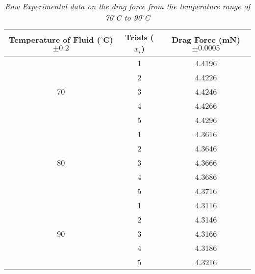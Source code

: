 \begin{table}[H]
  \centering
  \caption{\textit{Raw Experimental data on the drag force from the temperature range of 70$^\circ$C to 90$^\circ$C}}
    \begin{tabular}{ccc}
    \toprule
    Temperature of Fluid ($^\circ$C) $\pm 0.2$ & Trials ($x_i$) & Drag Force (mN) $\pm 0.0005$ \\
    \midrule
    \multirow{5}[10]{*}{70} & 1     & 4.4196 \\
\cmidrule{2-3}          & 2     & 4.4226 \\
\cmidrule{2-3}          & 3     & 4.4246 \\
\cmidrule{2-3}          & 4     & 4.4266 \\
\cmidrule{2-3}          & 5     & 4.4296 \\
    \midrule
    \multirow{5}[10]{*}{80} & 1     & 4.3616 \\
\cmidrule{2-3}          & 2     & 4.3646 \\
\cmidrule{2-3}          & 3     & 4.3666 \\
\cmidrule{2-3}          & 4     & 4.3686 \\
\cmidrule{2-3}          & 5     & 4.3716 \\
    \midrule
    \multirow{5}[10]{*}{90} & 1     & 4.3116 \\
\cmidrule{2-3}          & 2     & 4.3146 \\
\cmidrule{2-3}          & 3     & 4.3166 \\
\cmidrule{2-3}          & 4     & 4.3186 \\
\cmidrule{2-3}          & 5     & 4.3216 \\
    \bottomrule
    \end{tabular}%
  \label{tab:addlabel}%
\end{table}%




